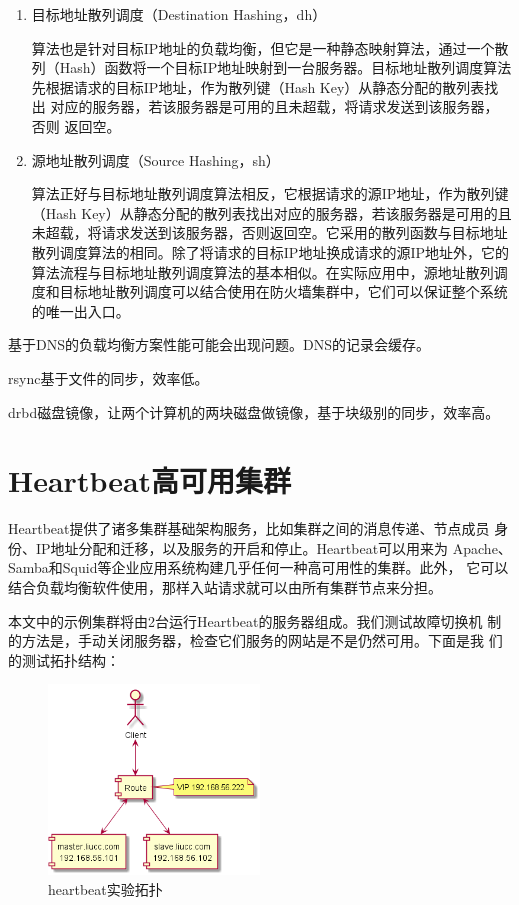 \begin{enumerate}[itemsep=0pt,parsep=0pt]
\item 目标地址散列调度（Destination Hashing，dh）

  算法也是针对目标IP地址的负载均衡，但它是一种静态映射算法，通过一个散
  列（Hash）函数将一个目标IP地址映射到一台服务器。目标地址散列调度算法
  先根据请求的目标IP地址，作为散列键（Hash Key）从静态分配的散列表找出
  对应的服务器，若该服务器是可用的且未超载，将请求发送到该服务器，否则
  返回空。

\item 源地址散列调度（Source Hashing，sh）

  算法正好与目标地址散列调度算法相反，它根据请求的源IP地址，作为散列键
  （Hash Key）从静态分配的散列表找出对应的服务器，若该服务器是可用的且
  未超载，将请求发送到该服务器，否则返回空。它采用的散列函数与目标地址
  散列调度算法的相同。除了将请求的目标IP地址换成请求的源IP地址外，它的
  算法流程与目标地址散列调度算法的基本相似。在实际应用中，源地址散列调
  度和目标地址散列调度可以结合使用在防火墙集群中，它们可以保证整个系统
  的唯一出入口。
\end{enumerate}


基于DNS的负载均衡方案性能可能会出现问题。DNS的记录会缓存。

rsync基于文件的同步，效率低。

drbd磁盘镜像，让两个计算机的两块磁盘做镜像，基于块级别的同步，效率高。

\chapter{Heartbeat高可用集群}

Heartbeat提供了诸多集群基础架构服务，比如集群之间的消息传递、节点成员
身份、IP地址分配和迁移，以及服务的开启和停止。Heartbeat可以用来为
Apache、Samba和Squid等企业应用系统构建几乎任何一种高可用性的集群。此外，
它可以结合负载均衡软件使用，那样入站请求就可以由所有集群节点来分担。

本文中的示例集群将由2台运行Heartbeat的服务器组成。我们测试故障切换机
制的方法是，手动关闭服务器，检查它们服务的网站是不是仍然可用。下面是我
们的测试拓扑结构：

\begin{figure}[!h]
  \centering
  \includegraphics[width=0.5\textwidth]{graph/heartbeat.png}
  \caption{heartbeat实验拓扑}
\end{figure}

